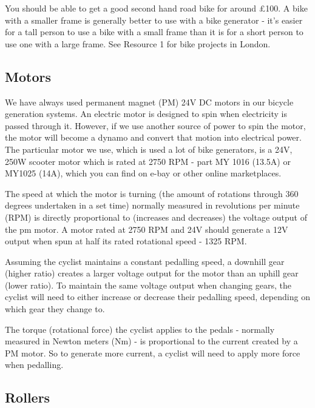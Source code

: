 \documentclass{article}
\theoremstyle{definition}
\theoremstyle{definition}
\theoremstyle{remark}
\begin{document}
      You should be able to get a good second hand road bike for around £100. A bike with a smaller frame is generally better to use with a bike generator - it’s easier for a tall person to use a bike with a small frame than it is for a short person to use one with a large frame. See Resource 1 for bike projects in London.
    
  

  {\color{blue}\subsection{Motors}} %
  \label{sub:motors}

    We have always used permanent magnet (PM) 24V DC motors in our bicycle generation systems. An electric motor is designed to spin when electricity is passed through it. However, if we use another source of power to spin the motor, the motor will become a dynamo and convert that motion into electrical power. The particular motor we use, which is used a lot of bike generators, is a 24V, 250W scooter motor which is rated at 2750 RPM - part MY 1016 (13.5A) or MY1025 (14A), which you can find on e-bay or other online marketplaces.

    The speed at which the motor is turning (the amount of rotations through 360 degrees undertaken in a set time) normally measured in revolutions per minute (RPM) is directly proportional to (increases and decreases) the voltage output of the pm motor. A motor rated at 2750 RPM and 24V should generate a 12V output when spun at half its rated rotational speed - 1325 RPM.

    Assuming the cyclist maintains a constant pedalling speed, a downhill gear (higher ratio) creates a larger voltage output for the motor than an uphill gear (lower ratio). To maintain the same voltage output when changing gears, the cyclist will need to either increase or decrease their pedalling speed, depending on which gear they change to.

    The torque (rotational force) the cyclist applies to the pedals - normally measured in Newton meters (Nm) - is proportional to the current created by a PM motor. So to generate more current, a cyclist will need to apply more force when pedalling.
      

  {\color{blue}\subsection{Rollers}} %
  \label{sub:rollers}
\end{document}
